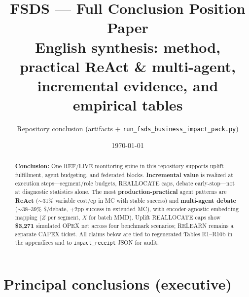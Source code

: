 \documentclass[11pt]{article}
\title{\textbf{FSDS --- Full Conclusion Position Paper}\\[0.4em]
\large English synthesis: method, practical ReAct \& multi-agent, incremental evidence, and empirical tables}
\author{Repository conclusion (artifacts + \texttt{run\_fsds\_business\_impact\_pack.py})}
\date{\today}
\begin{document}
\maketitle

\begin{abstract}
\textbf{Conclusion:} One REF/LIVE monitoring spine in this repository supports uplift fulfillment, agent budgeting, and federated blocks.
\textbf{Incremental value} is realized at execution steps---segment/role budgets, REALLOCATE caps, debate early-stop---not at diagnostic statistics alone.
The most \textbf{production-practical} agent patterns are \textbf{ReAct} ($\sim$31\% variable cost/ep in MC with stable success) and \textbf{multi-agent debate} ($\sim$38--39\% \$/debate, +2pp success in extended MC), with encoder-agnostic embedding mapping ($Z$ per segment, $X$ for batch MMD).
Uplift REALLOCATE caps show \textbf{\$3{,}271} simulated OPEX net across four benchmark scenarios; RELEARN remains a separate CAPEX ticket.
All claims below are tied to regenerated Tables R1--R10b in the appendices and to \texttt{impact\_receipt} JSON for audit.
\end{abstract}

\tableofcontents

\section{Principal conclusions (executive)}
\end{document}
